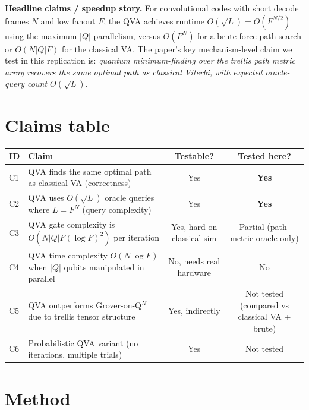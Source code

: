 \documentclass[11pt]{article}
\begin{document}
\textbf{Headline claims / speedup story.} For convolutional codes with
short decode frames $N$ and low fanout $F$, the QVA achieves runtime
$O(\sqrt{L})=O(F^{N/2})$ using the maximum $|Q|$ parallelism, versus
$O(F^N)$ for a brute-force path search or $O(N|Q|F)$ for the classical
VA. The paper's key mechanism-level claim we test in this replication
is: \emph{quantum minimum-finding over the trellis path metric array
recovers the same optimal path as classical Viterbi, with expected
oracle-query count $O(\sqrt{L})$.}

\section{Claims table}
\begin{center}
\begin{tabular}{@{}lp{7.5cm}cc@{}}
\toprule
ID & Claim & Testable? & Tested here? \\
\midrule
C1 & QVA finds the same optimal path as classical VA (correctness) & Yes & \textbf{Yes} \\
C2 & QVA uses $O(\sqrt{L})$ oracle queries where $L=F^N$ (query complexity) & Yes & \textbf{Yes} \\
C3 & QVA gate complexity is $O(N|Q|F(\log F)^2)$ per iteration & Yes, hard on classical sim & Partial (path-metric oracle only) \\
C4 & QVA time complexity $O(N\log F)$ when $|Q|$ qubits manipulated in parallel & No, needs real hardware & No \\
C5 & QVA outperforms Grover-on-Q$^{N}$ due to trellis tensor structure & Yes, indirectly & Not tested (compared vs classical VA + brute) \\
C6 & Probabilistic QVA variant (no iterations, multiple trials) & Yes & Not tested \\
\bottomrule
\end{tabular}
\end{center}

\section{Method}
\end{document}
